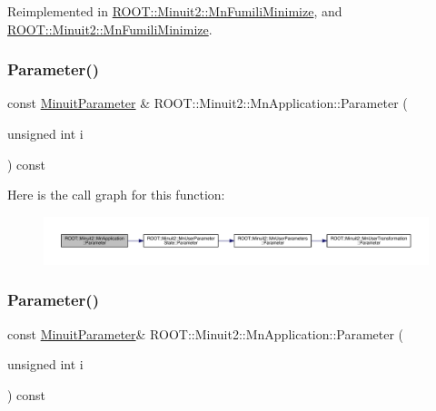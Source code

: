 Reimplemented in \mbox{\hyperlink{classROOT_1_1Minuit2_1_1MnFumiliMinimize_a408e4cc7d16335d7a9bfbb8765acec6d}{R\+O\+O\+T\+::\+Minuit2\+::\+Mn\+Fumili\+Minimize}}, and \mbox{\hyperlink{classROOT_1_1Minuit2_1_1MnFumiliMinimize_a58da42cb9def0b42c424a3121987e77b}{R\+O\+O\+T\+::\+Minuit2\+::\+Mn\+Fumili\+Minimize}}.

\mbox{\label{classROOT_1_1Minuit2_1_1MnApplication_a96f1a9c26e3f8c0de67e3680b127c7c1}} 
\subsubsection{\texorpdfstring{Parameter()}{Parameter()}\hspace{0.1cm}{\footnotesize\ttfamily [1/2]}}
{\footnotesize\ttfamily const \mbox{\hyperlink{classROOT_1_1Minuit2_1_1MinuitParameter}{Minuit\+Parameter}} \& R\+O\+O\+T\+::\+Minuit2\+::\+Mn\+Application\+::\+Parameter (\begin{DoxyParamCaption}\item[{unsigned int}]{i }\end{DoxyParamCaption}) const}

Here is the call graph for this function\+:\nopagebreak
\begin{figure}[H]
\begin{center}
\leavevmode
\includegraphics[width=350pt]{df/dd5/classROOT_1_1Minuit2_1_1MnApplication_a96f1a9c26e3f8c0de67e3680b127c7c1_cgraph}
\end{center}
\end{figure}
\mbox{\label{classROOT_1_1Minuit2_1_1MnApplication_aeb67b1d0ce5b357886d8413c3b166ef2}} 
\subsubsection{\texorpdfstring{Parameter()}{Parameter()}\hspace{0.1cm}{\footnotesize\ttfamily [2/2]}}
{\footnotesize\ttfamily const \mbox{\hyperlink{classROOT_1_1Minuit2_1_1MinuitParameter}{Minuit\+Parameter}}\& R\+O\+O\+T\+::\+Minuit2\+::\+Mn\+Application\+::\+Parameter (\begin{DoxyParamCaption}\item[{unsigned int}]{i }\end{DoxyParamCaption}) const}

